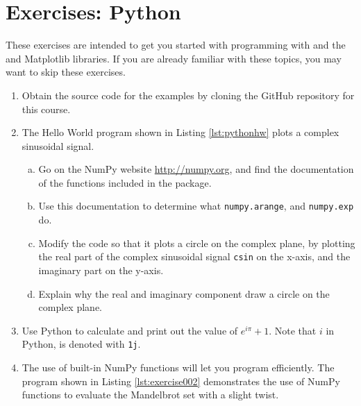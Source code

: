 \newpage
\section{Exercises: Python}

These exercises are intended to get you started with programming with
\emph{} and the \emph{} and
Matplotlib libraries. If you are already familiar with these topics,
you may want to skip these exercises.

\begin{enumerate}
  \item Obtain the source code for the examples by cloning the GitHub
        repository for this course.

  \item The Hello World program shown in Listing \ref{lst:pythonhw} plots a complex sinusoidal signal.
        \begin{enumerate}[a)]
          \item Go on the NumPy website \url{http://numpy.org}, and find the documentation of the functions included in the package.
          \item Use this documentation to determine what \verb|numpy.arange|, and \verb|numpy.exp| do.
          \item Modify the code so that it plots a circle on the complex
                plane, by plotting the real part of the complex sinusoidal
                signal \verb|csin| on the x-axis, and the imaginary part on the
                y-axis.
          \item Explain why the real and imaginary component draw a circle on the complex plane.
        \end{enumerate}

  \item Use Python to calculate and print out the value of $e^{i \pi} + 1$. Note that $i$ in Python, is denoted
        with \verb|1j|.

  \item The use of built-in NumPy functions will let you program
        efficiently. The program shown in Listing \ref{lst:exercise002}
        demonstrates the use of NumPy functions to evaluate the Mandelbrot
        set with a slight twist.

        


\end{enumerate}
